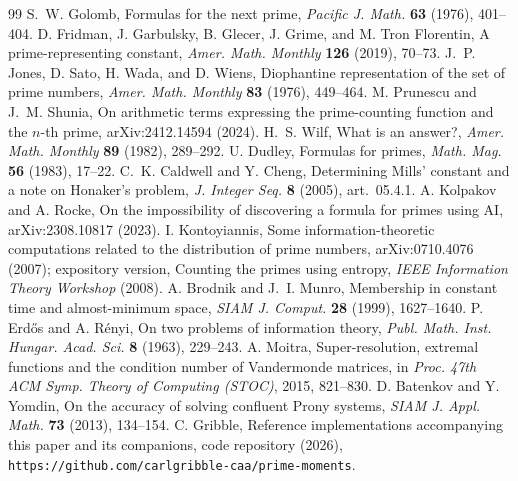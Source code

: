 \documentclass[11pt]{article}
\theoremstyle{remark}
\begin{document}
\begin{thebibliography}{99}
 S.~W. Golomb, Formulas for the next prime, \emph{Pacific J. Math.} \textbf{63}
(1976), 401--404.
 D. Fridman, J. Garbulsky, B. Glecer, J. Grime, and M. Tron Florentin, A
prime-representing constant, \emph{Amer. Math. Monthly} \textbf{126} (2019), 70--73.
 J.~P. Jones, D. Sato, H. Wada, and D. Wiens, Diophantine representation of the set of
prime numbers, \emph{Amer. Math. Monthly} \textbf{83} (1976), 449--464.
 M. Prunescu and J.~M. Shunia, On arithmetic terms expressing the
prime-counting function and the $n$-th prime, arXiv:2412.14594 (2024).
 H.~S. Wilf, What is an answer?, \emph{Amer. Math. Monthly} \textbf{89} (1982),
289--292.
 U. Dudley, Formulas for primes, \emph{Math. Mag.} \textbf{56} (1983), 17--22.
 C.~K. Caldwell and Y. Cheng, Determining Mills' constant and a note on
Honaker's problem, \emph{J. Integer Seq.} \textbf{8} (2005), art.~05.4.1.
 A. Kolpakov and A. Rocke, On the impossibility of discovering a formula for
primes using AI, arXiv:2308.10817 (2023).
 I. Kontoyiannis, Some information-theoretic computations related to the
distribution of prime numbers, arXiv:0710.4076 (2007); expository version, Counting the primes using
entropy, \emph{IEEE Information Theory Workshop} (2008).
 A. Brodnik and J.~I. Munro, Membership in constant time and almost-minimum
space, \emph{SIAM J. Comput.} \textbf{28} (1999), 1627--1640.
 P. Erd\H{o}s and A. R\'enyi, On two problems of information theory,
\emph{Publ. Math. Inst. Hungar. Acad. Sci.} \textbf{8} (1963), 229--243.
 A. Moitra, Super-resolution, extremal functions and the condition number of
Vandermonde matrices, in \emph{Proc. 47th ACM Symp. Theory of Computing (STOC)}, 2015, 821--830.
 D. Batenkov and Y. Yomdin, On the accuracy of solving confluent Prony systems,
\emph{SIAM J. Appl. Math.} \textbf{73} (2013), 134--154.
 C. Gribble, Reference implementations accompanying this paper and its companions,
code repository (2026), \texttt{https://github.com/carlgribble-caa/prime-moments}.
\end{thebibliography}
\end{document}
